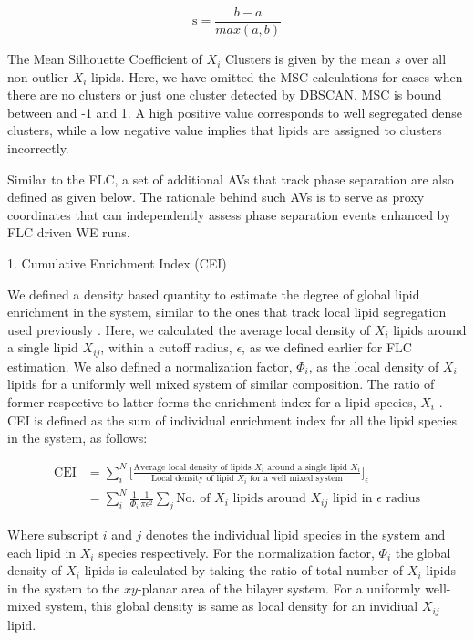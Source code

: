 \documentclass{biophys-new}
\begin{document}
\begin{equation}
\label{eq:SC}
\text{s} = \frac{b - a}{max(a,b)}
\end{equation}

The Mean Silhouette Coefficient of $X_i$ Clusters is given by the mean $s$ over all non-outlier $X_i$ lipids.
Here, we have omitted the MSC calculations for cases when there are no clusters or just one cluster detected by DBSCAN. 
MSC is bound between and -1 and 1.
A high positive value corresponds to well segregated dense clusters, while a low negative value implies that lipids are assigned to clusters incorrectly.  

Similar to the FLC, a set of additional AVs that track phase separation are also defined as given below.
The rationale behind such AVs is to serve as proxy coordinates that can independently assess phase separation events enhanced by FLC driven WE runs. 

1. Cumulative Enrichment Index (CEI)

We defined a density based quantity to estimate the degree of global lipid enrichment in the system, similar to the ones that track local lipid segregation used previously \cite{Gu2019, Gu2020}.
Here, we calculated the average local density of $X_i$ lipids around a single lipid $X_{ij}$, within a cutoff radius, $\epsilon$, as we defined earlier for FLC estimation.
We also defined a normalization factor, $\Phi_i$, as the local density of $X_i$ lipids for a uniformly well mixed system of similar composition.
The ratio of former respective to latter forms the enrichment index for a lipid species, $X_i$ .
CEI is defined as the sum of individual enrichment index for all the lipid species in the system, as follows:  

\begin{equation}
    \begin{aligned}
    \label{eq:CLT}
    \text{CEI} {}   & = \sum_{i}^{N}\Bigg[\frac{\text{Average local density of lipids $X_i$ around a single lipid $X_i$}}{\text{Local density of lipid $X_i$ for a well mixed system}}\Bigg]_{\text{$\epsilon$}} \\
                    & =  \sum_{i}^{N} \frac{1}{\Phi_i}\frac{1}{\text{$\pi\epsilon^2$}}\sum_{j}\text{No. of $X_i$ lipids around $X_{ij}$ lipid in $\epsilon$ radius}
    \end{aligned}
\end{equation}

Where subscript $i$ and $j$ denotes the individual lipid species in the system and each lipid in $X_i$ species respectively.
For the normalization factor, $\Phi_i$ the global density of $X_i$ lipids is calculated by taking the ratio of total number of $X_i$ lipids in the system to the $xy$-planar area of the bilayer system.
For a uniformly well-mixed system, this global density is same as local density for an invidiual $X_{ij}$ lipid.
\end{document}

